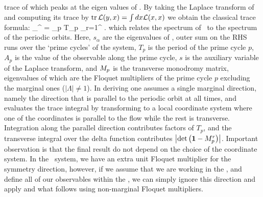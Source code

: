 \eeq
trace of which peaks at the eigen values of \Aop. By taking the
Laplace transform of  and computing its trace
by $\mbox{\rm tr}\, {\cal L} (y,x) = \int dx {\cal L} (x,x)$ we obtain the
classical trace formula:
\beq
\sum_{}^{\infty}  = \sum_p T_p
\sum_{r=1}^{\infty}  .
which relates the spectrum of \Aop\ to the spectrum of the periodic
orbits. Here, $s_{\alpha}$ are the eigenvalues of \Aop ,
outer sum on the RHS runs over the `prime cycles' of the system,
$T_p$ is the period of the prime cycle $p$, $A_p$ is the value of
the observable along the prime cycle, $s$ is the auxiliary
variable of the Laplace transform, and $M_p$ is the transverse
monodromy matrix, eigenvalues of which are the Floquet multipliers of the prime
cycle $p$ excluding the marginal ones ($|\Lambda| \neq 1$). In deriving
 one assumes a single marginal direction, namely
the direction that is parallel to the periodic orbit at all times, and evaluates
the trace integral by transforming to a local coordinate system where one of the
coordinates is parallel to the flow while the rest is transverse. Integration along
the parallel direction contributes factors of $T_p$, and the transverse integral
over the delta function contributes $\left|\mbox{\rm det}\,\!\left({\bf 1}-M_p^{r}\right)\right|$. Important observation is that
the final result  do not depend on the choice
of the coordinate system. In the \twomode\ system, we have an extra unit Floquet
multiplier for the symmetry direction, however, if we assume that we are working
in the \slice , and define all of our observables within the \slice , we can
simply ignore this direction and apply  and what
follows using non-marginal Floquet multipliers.

